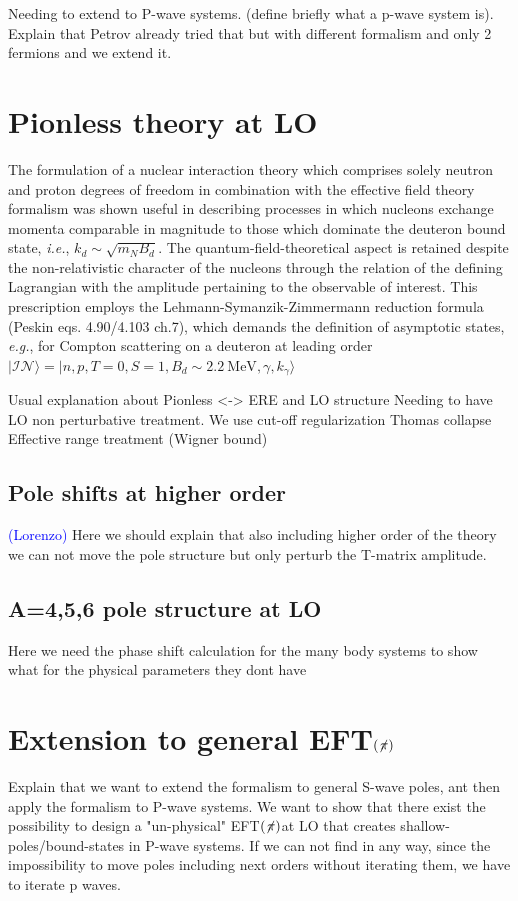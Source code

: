 \documentclass[onecolumn,preprint,nosuperscriptaddress,nofootinbib,12pt,linenumbers]{revtex4-1}
\newcommand{\blue}[1]{\textcolor{blue}{#1}}
\newcommand{\eg}{\textit{e.g.}\;}
\newcommand{\ie}{\textit{i.e.}\;}
\newcommand{\eftnopi}{\mbox{EFT$(\not \! \pi)$}}
\begin{document}
Needing to extend to P-wave systems. (define briefly what a p-wave system is).
Explain that Petrov already tried that but with different formalism and only 2 fermions and we extend it.

\section{Pionless theory at LO}
The formulation of a nuclear interaction theory which comprises solely neutron and proton degrees of
freedom in combination with the effective field theory formalism was shown useful in describing
processes in which nucleons exchange momenta comparable in magnitude to those which dominate
the deuteron bound state, \ie, $k_d\sim\sqrt{m_NB_d}$. The quantum-field-theoretical aspect is retained
despite the non-relativistic character of the nucleons through the relation of the defining Lagrangian
with the amplitude pertaining to the observable of interest. This prescription employs the
Lehmann-Symanzik-Zimmermann reduction formula (Peskin eqs. 4.90/4.103 ch.7), which demands the
definition of asymptotic states, \eg, for Compton scattering on a deuteron at leading order
$\vert\mathcal{IN}\rangle=\vert n,p,T=0,S=1,B_d\sim2.2~\text{MeV},\gamma,k_\gamma\rangle$


Usual explanation about Pionless <-> ERE and LO structure
Needing to have LO non perturbative treatment.
We use cut-off regularization
Thomas collapse
Effective range treatment (Wigner bound)

\subsection{Pole shifts at higher order}
\blue{(Lorenzo)} Here we should explain that also including higher order of the 
theory we can not move the pole structure but only perturb the T-matrix amplitude.

\subsection{A=4,5,6 pole structure at LO}
Here we need the phase shift calculation for the many body systems to show what for the physical parameters they dont have 



\section{Extension to general \eftnopi}
Explain that we want to extend the formalism to general S-wave poles,
ant then apply the formalism to P-wave systems.
We want to show that there exist the possibility to design a "un-physical" \eftnopi at LO
that creates shallow-poles/bound-states in P-wave systems.
If we can not find in any way, since the impossibility to move poles including next orders without iterating them, 
we have to iterate p waves.
\end{document}
